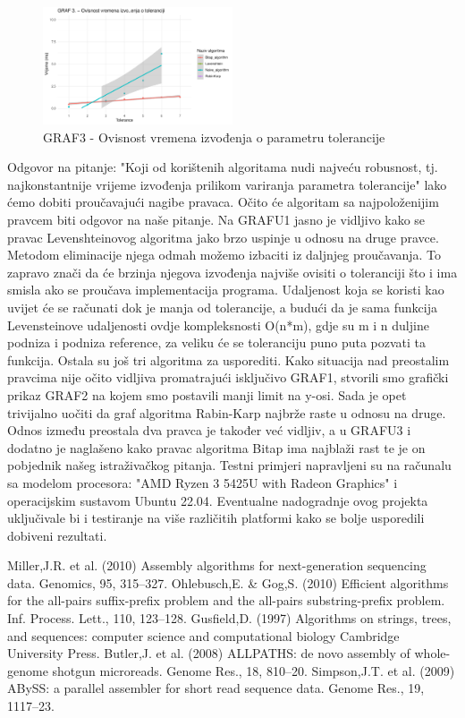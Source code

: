 \documentclass[conference]{IEEEtran}
\begin{document}
\begin{figure}[htbp]
\centerline{\includegraphics[width=0.5\textwidth]{Grafovi_i_csv_datoteke/GRAF3.png}}
\caption{GRAF3 - Ovisnost vremena izvođenja o parametru tolerancije}
\label{fig}
\end{figure}
\newpage
Odgovor na pitanje: "Koji od korištenih algoritama nudi najveću robusnost, tj. najkonstantnije vrijeme izvođenja prilikom variranja parametra tolerancije" lako ćemo dobiti proučavajući nagibe pravaca. Očito će algoritam sa najpoloženijim pravcem biti odgovor na naše pitanje. 
Na GRAFU1 jasno je vidljivo kako se pravac Levenshteinovog algoritma jako brzo uspinje u odnosu na druge pravce. Metodom eliminacije njega odmah možemo izbaciti iz daljnjeg proučavanja. %
To zapravo znači da će brzinja njegova izvođenja najviše ovisiti o toleranciji što i ima smisla ako se proučava implementacija programa. Udaljenost koja se koristi kao uvijet će se računati dok je manja od tolerancije, a budući da je sama funkcija Levensteinove udaljenosti ovdje kompleksnosti O(n*m), gdje su m i n duljine podniza i podniza reference, za veliku će se toleranciju puno puta pozvati ta funkcija. Ostala su još tri algoritma za usporediti.%
Kako situacija nad preostalim pravcima nije očito vidljiva promatrajući isključivo GRAF1, stvorili smo grafički prikaz GRAF2 na kojem smo postavili manji limit na y-osi. Sada je opet trivijalno uočiti da graf algoritma Rabin-Karp najbrže raste u odnosu na druge.
Odnos između preostala dva pravca je također već vidljiv, a u GRAFU3 i dodatno je naglašeno kako pravac algoritma Bitap ima najblaži rast te je on pobjednik našeg istraživačkog pitanja. 
Testni primjeri napravljeni su na računalu sa modelom procesora: "AMD Ryzen 3 5425U with Radeon Graphics" i operacijskim sustavom Ubuntu 22.04. Eventualne nadogradnje ovog projekta uključivale bi i testiranje na više različitih platformi kako se bolje usporedili dobiveni rezultati.

\begin{thebibliography}{00}
 Miller,J.R. et al. (2010) Assembly algorithms for next-generation sequencing data.
Genomics, 95, 315–327.
 Ohlebusch,E. \& Gog,S. (2010) Efficient algorithms for the all-pairs suffix-prefix problem and the all-pairs substring-prefix problem. Inf. Process. Lett., 110, 123–128.
 Gusfield,D. (1997) Algorithms on strings, trees, and sequences: computer science and
computational biology Cambridge University Press.
 Butler,J. et al. (2008) ALLPATHS: de novo assembly of whole-genome shotgun
microreads. Genome Res., 18, 810–20.
 Simpson,J.T. et al. (2009) ABySS: a parallel assembler for short read sequence data.
Genome Res., 19, 1117–23.

\end{thebibliography}
\end{document}
